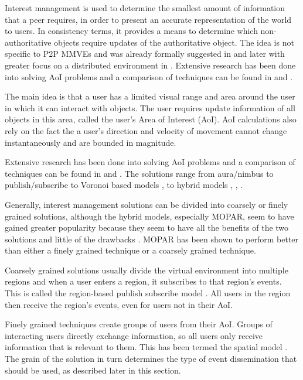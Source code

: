 Interest management is used to determine the smallest amount of information that a peer requires, in order to present an accurate representation of
the world to users. In consistency terms, it provides a means to determine which non-authoritative objects require updates of the authoritative object. The idea is
not specific to P2P MMVEs and was already formally suggested in \cite{First_IM} and later with greater focus on a distributed environment in \cite{Whang_agent_based_IM}. Extensive research has been done into solving AoI problems and a comparison of techniques can be found in
\cite{Boulanger_IM_compare} and \cite{IM_and_ED_survey_Krause}.

The main idea is that a user has a limited visual range and area around the user in which it can interact with objects. The user requires
update information of all objects in this area, called the user's Area of Interest (AoI). AoI calculations also rely on the fact the a user's
direction and velocity of movement cannot change instantaneously and are bounded in magnitude.

Extensive research has been done into solving AoI problems and a comparison of techniques can be found in \cite{Boulanger_IM_compare} and
\cite{IM_and_ED_survey_Krause}. The solutions range from aura/nimbus \cite{Benford_spatial_IM} to publish/subscribe  \cite{mercury_publish_subscribe} to Voronoi based models \cite{Hu_voronoi_IM},  \cite{Buyukkaya_voronoi_state_management} to hybrid models \cite{hybrid_IM}, \cite{MOPAR}, \cite{fan_mediator_paper}.

Generally, interest management solutions can be divided into coarsely or finely grained solutions, although the hybrid models, especially MOPAR, seem to have gained greater popularity because they seem to have all the benefits of the two solutions and little of the drawbacks \cite{MOPAR}. MOPAR has
been shown to perform better than either a finely grained technique or a coarsely grained technique.

Coarsely grained solutions usually divide the virtual environment into multiple regions and when a user enters a region, it subscribes to that region's
events. This is called the region-based publish subscribe model \cite{Fan_deisgn_issues_p2p}. All users in the region then receive the region's events, even for users not in their AoI.

Finely grained techniques create groups of users from their AoI. Groups of interacting users directly exchange information, so all users
only receive information that is relevant to them. This has been termed the spatial model \cite{Fan_deisgn_issues_p2p}. The grain of the solution in
turn determines the type of event dissemination that should be used, as described later in this section.

